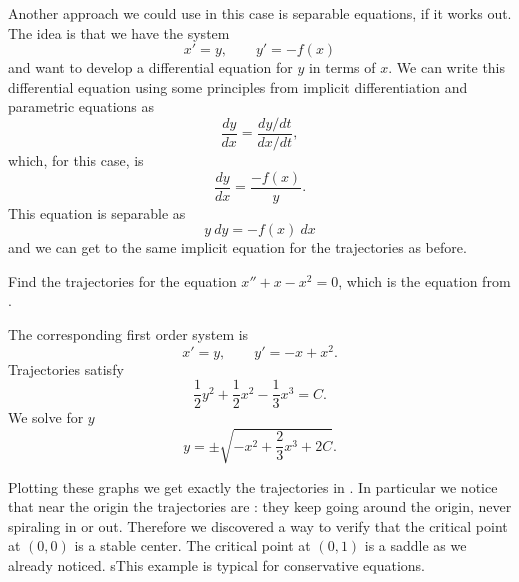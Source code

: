 \documentclass{ximera}
\begin{document}
Another approach we could use in this case is separable equations, if it works out. The idea is that we have the system
\begin{equation*}
    x' = y, \qquad y' = -f(x)
\end{equation*}
and want to develop a differential equation for $y$ in terms of $x$. We can write this differential equation using some principles from implicit differentiation and parametric equations as
\begin{equation*}
    \frac{dy}{dx} = \frac{dy/dt}{dx/dt},
\end{equation*}
which, for this case, is 
\begin{equation*}
    \frac{dy}{dx} = \frac{-f(x)}{y}.
\end{equation*}
This equation is separable as
\begin{equation*}
    y\ dy = -f(x)\ dx
\end{equation*}
and we can get to the same implicit equation for the trajectories as before. 

\begin{example}
    Find the trajectories for the equation $x'' + x-x^2 = 0$, which is the equation from .
\end{example}

\begin{exampleSol}  
    The corresponding first order system is
    \begin{equation*}
        x' = y , \qquad y' = -x+x^2 .
    \end{equation*}
    Trajectories satisfy
    \begin{equation*}
        \frac{1}{2} y^2  + \frac{1}{2} x^2 - \frac{1}{3} x^3  = C .
    \end{equation*}
    We solve for $y$
    \begin{equation*}
        y = \pm \sqrt{-x^2 + \frac{2}{3} x^3  + 2C} .
    \end{equation*}
    
    Plotting these graphs we get exactly the trajectories in .  In particular we notice that near the origin the trajectories are \emph{}: they keep going around the origin, never spiraling in or out.  Therefore we discovered a way to verify that the critical point at $(0,0)$ is a stable center. The critical point at $(0,1)$ is a saddle as we already noticed. sThis example is typical for conservative equations. 
\end{exampleSol}
\end{document}
